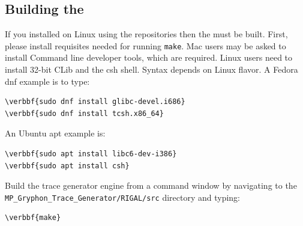 \documentclass[11pt,fleqn]{article} %
\begin{document}
\subsection{Building the \gtg}
If you installed on Linux using the repositories then the \gtg must be built.
First, please install requisites needed for running \verb+make+.
Mac users may be asked to install Command line developer tools, which are required.  Linux users need to install 32-bit CLib and the csh shell. Syntax depends on Linux flavor.  A Fedora dnf example is to type:
\begin{Verbatim}[commandchars=\\\{\}]
\verbbf{sudo dnf install glibc-devel.i686}
\verbbf{sudo dnf install tcsh.x86_64}
\end{Verbatim}

An Ubuntu apt example is:
\begin{Verbatim}[commandchars=\\\{\}]
\verbbf{sudo apt install libc6-dev-i386}
\verbbf{sudo apt install csh}
\end{Verbatim}

Build the trace generator engine from a command window by navigating to the \verb+MP_Gryphon_Trace_Generator/RIGAL/src+ directory and typing:
\begin{Verbatim}[commandchars=\\\{\}]
\verbbf{make}
\end{Verbatim}
\end{document}
